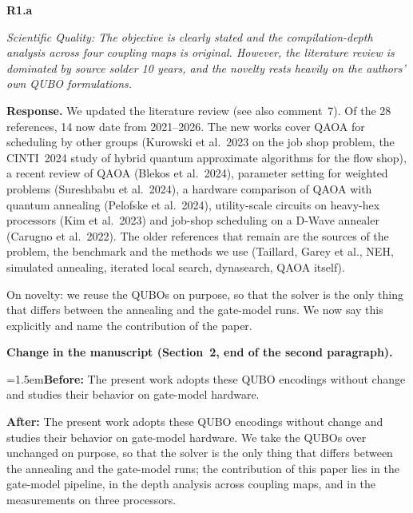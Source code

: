 \documentclass[11pt]{article}
\newenvironment{rc}[1]{\par\medskip\noindent\textbf{#1}\par\nopagebreak\noindent\itshape\ignorespaces}{\par}
\newcommand{\answer}[1]{\par\smallskip\noindent\textbf{Response.} #1\par}
\newcommand{\change}[3]{\par\smallskip\noindent\textbf{Change in the manuscript (#1).}\par
  {\leftskip=1.5em\noindent\textbf{Before:} #2\par\noindent\textbf{After:} #3\par}}
\begin{document}
\begin{rc}{R1.a}
Scientific Quality: The objective is clearly stated and the compilation-depth analysis across four coupling maps is original. However, the literature review is dominated by source solder 10 years, and the novelty rests heavily on the authors' own QUBO formulations.
\end{rc}
\answer{We updated the literature review (see also comment~7). Of the 28 references, 14 now date from 2021--2026. The new works cover QAOA for scheduling by other groups (Kurowski et al.\ 2023 on the job shop problem, the CINTI~2024 study of hybrid quantum approximate algorithms for the flow shop), a recent review of QAOA (Blekos et al.\ 2024), parameter setting for weighted problems (Sureshbabu et al.\ 2024), a hardware comparison of QAOA with quantum annealing (Pelofske et al.\ 2024), utility-scale circuits on heavy-hex processors (Kim et al.\ 2023) and job-shop scheduling on a D-Wave annealer (Carugno et al.\ 2022). The older references that remain are the sources of the problem, the benchmark and the methods we use (Taillard, Garey et al., NEH, simulated annealing, iterated local search, dynasearch, QAOA itself).

On novelty: we reuse the QUBOs on purpose, so that the solver is the only thing that differs between the annealing and the gate-model runs. We now say this explicitly and name the contribution of the paper.}
\change{Section~2, end of the second paragraph}{The present work adopts these QUBO encodings without change and studies their behavior on gate-model hardware.}{The present work adopts these QUBO encodings without change and studies their behavior on gate-model hardware. We take the QUBOs over unchanged on purpose, so that the solver is the only thing that differs between the annealing and the gate-model runs; the contribution of this paper lies in the gate-model pipeline, in the depth analysis across coupling maps, and in the measurements on three processors.}
\end{document}

